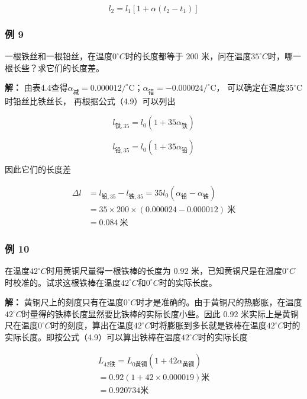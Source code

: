 \[
l _ {2} = l _ {1} \left[ 1 + \alpha (t _ {2} - t _ {1}) \right] \tag {4.10}
\]

\subsubsection{例 9}\label{ux4f8b-9}

一根铁丝和一根铅丝，在温度\(0^{\circ}C\)时的长度都等于 200
米，问在温度\(35^{\circ}C\)时，哪一根长些？求它们的长度差。

\textbf{解：}
由表4.4查得\(\alpha_{\text{减}} = 0.000012 / ^{\circ}\mathrm{C}\)；\(\alpha_{\text{错}} = -0.000024 / ^{\circ}\mathrm{C}\)，
可以确定在温度\(35^{\circ}\mathrm{C}\)时铅丝比铁丝长，
再根据公式（4.9）可以列出

\[
l_{\text{铁},35}=l_0(1+35\alpha_{\text{铁}})
\]

\[
l_{\text{铅},35}=l_0(1+35\alpha_{\text{铅}})
\]

因此它们的长度差

\[
\begin{aligned}\Delta l&=l_{\text{铅},35}-l_{\text{铁},35}=35l_0(\alpha_{\text{铅}}-\alpha_{\text{铁}})\\&=35\times200\times(0.000024-0.000012)\ \text{米}\\&=0.084\ \text{米}\end{aligned}
\]

\subsubsection{例 10}\label{ux4f8b-10}

在温度\(42^{\circ}C\)时用黄铜尺量得一根铁棒的长度为 0.92
米，已知黄铜尺是在温度\(0^{\circ}C\)时校准的。试求这根铁棒在温度\(42^{\circ}C\)和\(0^{\circ}C\)时的实际长度。

\textbf{解：}
黄铜尺上的刻度只有在温度\(0^{\circ}C\)时才是准确的。由于黄铜尺的热膨胀，在温度\(42^{\circ}C\)时量得的铁棒长度显然要比铁棒的实际长度小些。因此
0.92
米实际上是黄铜尺在温度\(0^{\circ}C\)时的刻度，算出在温度\(42^{\circ}C\)时将膨胀到多长就是铁棒在温度\(42^{\circ}C\)时的实际长度。即按公式（4.9）可以算出铁棒在温度\(42^{\circ}C\)时的实际长度

\[
\begin{array}{l} L _ {42 \text{铁}} = L _ {0 \text{黄铜}} (1 + 42 \alpha_ {\text{黄铜}}) \\ = 0.92 (1 + 42 \times 0.000019) \text{米} \\ = 0.920734 \text{米} \\ \end{array}
\]

